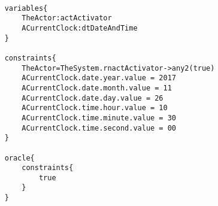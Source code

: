 	\scriptsize
	\vspace{0.5cm}
	\begin{lstlisting}[style=MessirStyle,firstnumber=auto,captionpos=b,caption={\msrmessir (MCL-oriented) specification of the test step \emph{testcase01-ts08oeSetClock03}.},label=TM-testcase01-ts08oeSetClock03-MCL-LST]

	variables{
		TheActor:actActivator
		ACurrentClock:dtDateAndTime
	}
	
	constraints{
		TheActor=TheSystem.rnactActivator->any2(true)
		ACurrentClock.date.year.value = 2017
		ACurrentClock.date.month.value = 11
		ACurrentClock.date.day.value = 26
		ACurrentClock.time.hour.value = 10
		ACurrentClock.time.minute.value = 30
		ACurrentClock.time.second.value = 00
	}
	
	oracle{
		constraints{
			true
		}
	}
	
	\end{lstlisting}
	\normalsize 
	
	

